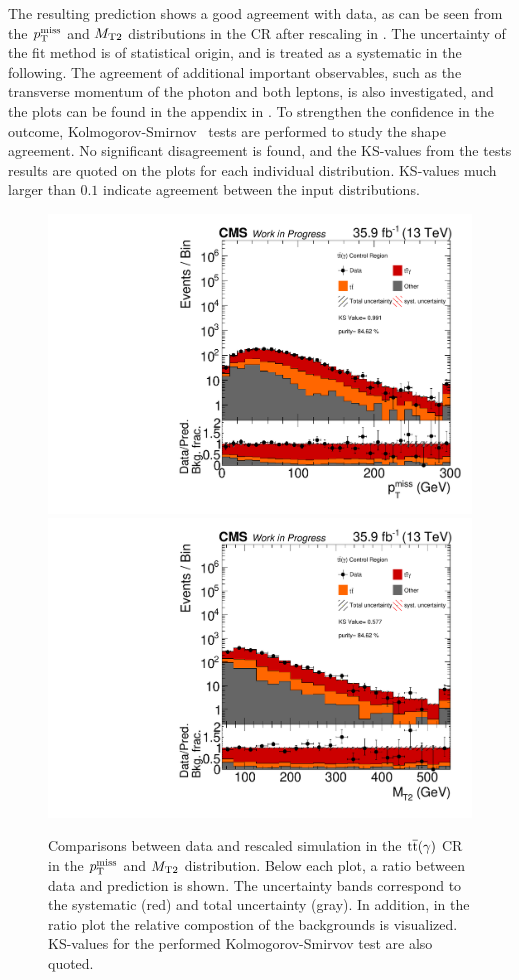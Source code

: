 The resulting prediction shows a good agreement with data, as can be seen from the $p_{\mathrm{T}}^\text{miss}$ and $M_{\mathrm{T2}}$ distributions in the CR after rescaling in . The uncertainty of the fit method is of statistical origin, and is treated as a systematic in the following. The agreement of additional important observables, such as the transverse momentum of the photon and both leptons, is also investigated, and the plots can be found in the appendix in . To strengthen the confidence in the outcome, Kolmogorov-Smirnov~\cite{KS} tests are performed to study the shape agreement. No significant disagreement is found, and the KS-values from the tests results are quoted on the plots for each individual distribution. KS-values much larger than $0.1$ indicate agreement between the input distributions.
\begin{figure}[tbp]
 \centering
 \includegraphics[width=\pairwidth]{figures/plots_CR_tt/CRTT_EM_nom_met_log}
 \includegraphics[width=\pairwidth]{figures/plots_CR_tt/CRTT_EM_nom_mt2_log}
 \caption{Comparisons between data and rescaled simulation in the ${\mathrm{t}\overline{\mathrm{t}}}(\gamma)$ CR in the $p_{\mathrm{T}}^\text{miss}$ and $M_{\mathrm{T2}}$ distribution. Below each plot, a ratio between data and prediction is shown. The uncertainty bands correspond to the systematic (red) and total uncertainty (gray). In addition, in the ratio plot the relative compostion of the backgrounds is visualized. KS-values for the performed Kolmogorov-Smirvov test are also quoted.}
 \label{fig:CRTT}
\end{figure}
